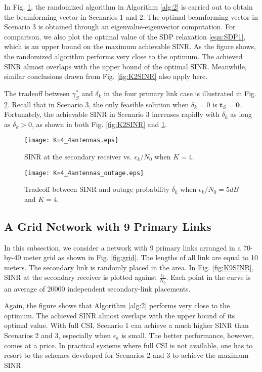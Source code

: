 \documentclass[twocolumn,10pt]{IEEEtran}
\theoremstyle{plain} \newtheorem{theorem}{Theorem}
\theoremstyle{plain} \newtheorem{proposition}{Proposition}
\theoremstyle{plain} \newtheorem{corollary}{Corollary}
\theoremstyle{remark} \newtheorem{remark}{Remark}
\theoremstyle{remark} \newtheorem{lemma}{Lemma}
\theoremstyle{plain} \newtheorem{definition}{Definition}
\theoremstyle{plain} \newtheorem{assumption}{Assumption}
\theoremstyle{plain} \newtheorem{fact}{Fact}
\begin{document}
In Fig. \ref{fig:K4SINR}, the randomized algorithm in Algorithm \ref{alg:2} is carried out to obtain the beamforming vector in Scenarios 1 and 2. The optimal beamforming vector in Scenario 3 is obtained through an eigenvalue-eigenvector computation. For comparison, we also plot the optimal value of the SDP relaxation \eqref{eqn:SDP1}, which is an upper bound on the maximum achievable SINR. As the figure shows, the randomized algorithm performs very close to the optimum. The achieved SINR almost overlaps with the upper bound of the optimal SINR. Meanwhile, similar conclusions drawn from Fig. \ref{fig:K2SINR} also apply here.

The tradeoff between $\gamma_S^*$ and $\delta_k$ in the four primary link case is illustrated in Fig. \ref{fig:K4outage}. Recall that in Scenario 3, the only feasible solution when $\delta_k=0$ is $\mathbf{t}_S=\mathbf{0}$. Fortunately, the achievable SINR in Scenario 3 increases rapidly with $\delta_k$ as long as $\delta_k>0$, as shown in both Fig. \ref{fig:K2SINR} and \ref{fig:K4SINR}.

\begin{figure}[!ht]
\centering
\texttt{[image: K=4\_4antennas.eps]}
\caption{SINR at the secondary receiver vs. $\epsilon_k/N_0$ when $K=4$.}\label{fig:K4SINR}
\end{figure}

\begin{figure}[!ht]
\centering
\texttt{[image: K=4\_4antennas\_outage.eps]}
\caption{Tradeoff between SINR and outage probability $\delta_k$ when $\epsilon_k/N_0=5dB$ and $K=4$.}\label{fig:K4outage}
\end{figure}

\subsection{A Grid Network with 9 Primary Links}
In this subsection, we consider a network with 9 primary links arranged in a 70-by-40 meter grid as shown in Fig. \ref{fig:grid}. The lengths of all link are equal to 10 meters. The secondary link is randomly placed in the area. In Fig. \ref{fig:K9SINR}, SINR at the secondary receiver is plotted against $\frac{\epsilon_k}{N_0}$. Each point in the curve is an average of 20000 independent secondary-link placements.

Again, the figure shows that Algorithm \ref{alg:2} performs very close to the optimum. The achieved SINR almost overlaps with the upper bound of its optimal value. With full CSI, Scenario 1 can achieve a much higher SINR than Scenarios 2 and 3, especially when $\epsilon_k$ is small. The better performance, however, comes at a price. In practical systems where full CSI is not available, one has to resort to the schemes developed for Scenarios 2 and 3 to achieve the maximum SINR.
\end{document}
